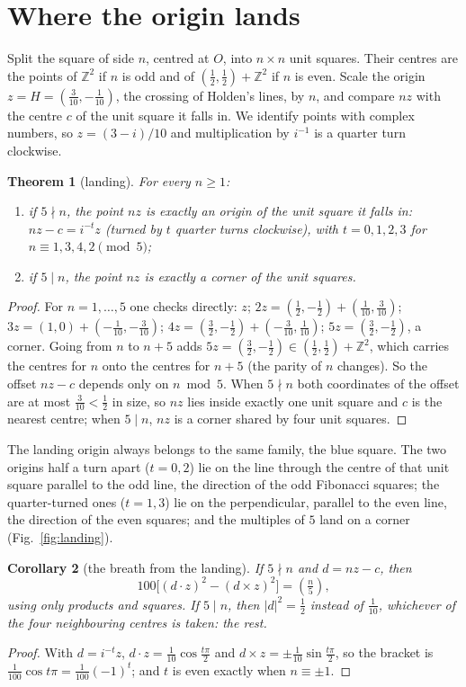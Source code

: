 \documentclass[11pt,a4paper]{article}
\theoremstyle{plain}
\newtheorem{theorem}{Theorem}
\newtheorem{corollary}[theorem]{Corollary}
\theoremstyle{definition}
\theoremstyle{remark}
\newcommand{\leg}[1]{\left(\tfrac{#1}{5}\right)}
\begin{document}
\section{Where the origin lands}
Split the square of side $n$, centred at $O$, into $n\times n$ unit squares. Their centres are the points of $\mathbb Z^2$ if $n$ is odd and of $(\tfrac12,\tfrac12)+\mathbb Z^2$ if $n$ is even. Scale the origin $z=H=(\tfrac3{10},-\tfrac1{10})$, the crossing of Holden's lines, by $n$, and compare $nz$ with the centre $c$ of the unit square it falls in. We identify points with complex numbers, so $z=(3-i)/10$ and multiplication by $i^{-1}$ is a quarter turn clockwise.
\begin{theorem}[landing]\label{thm:landing}
For every $n\ge1$:
\begin{enumerate}[label=(\alph*),nosep]
\item if $5\nmid n$, the point $nz$ is exactly an origin of the unit square it falls in: $nz-c=i^{-t}z$ (turned by $t$ quarter turns clockwise), with $t=0,1,2,3$ for $n\equiv1,3,4,2\pmod5$;
\item if $5\mid n$, the point $nz$ is exactly a corner of the unit squares.
\end{enumerate}
\end{theorem}
\begin{proof}
For $n=1,\dots,5$ one checks directly: $z$; $2z=(\tfrac12,-\tfrac12)+(\tfrac1{10},\tfrac3{10})$; $3z=(1,0)+(-\tfrac1{10},-\tfrac3{10})$; $4z=(\tfrac32,-\tfrac12)+(-\tfrac3{10},\tfrac1{10})$; $5z=(\tfrac32,-\tfrac12)$, a corner. Going from $n$ to $n+5$ adds $5z=(\tfrac32,-\tfrac12)\in(\tfrac12,\tfrac12)+\mathbb Z^2$, which carries the centres for $n$ onto the centres for $n+5$ (the parity of $n$ changes). So the offset $nz-c$ depends only on $n\bmod5$. When $5\nmid n$ both coordinates of the offset are at most $\tfrac3{10}<\tfrac12$ in size, so $nz$ lies inside exactly one unit square and $c$ is the nearest centre; when $5\mid n$, $nz$ is a corner shared by four unit squares.
\end{proof}
The landing origin always belongs to the same family, the blue square. The two origins half a turn apart ($t=0,2$) lie on the line through the centre of that unit square parallel to the odd line, the direction of the odd Fibonacci squares; the quarter-turned ones ($t=1,3$) lie on the perpendicular, parallel to the even line, the direction of the even squares; and the multiples of $5$ land on a corner (Fig.~\ref{fig:landing}).

\begin{corollary}[the breath from the landing]\label{cor:sign}
If $5\nmid n$ and $d=nz-c$, then
\[
100\bigl[(d\cdot z)^2-(d\times z)^2\bigr]=\leg{n},
\]
using only products and squares. If $5\mid n$, then $|d|^2=\tfrac12$ instead of $\tfrac1{10}$, whichever of the four neighbouring centres is taken: the rest.
\end{corollary}
\begin{proof}
With $d=i^{-t}z$, $d\cdot z=\tfrac1{10}\cos\tfrac{t\pi}2$ and $d\times z=\pm\tfrac1{10}\sin\tfrac{t\pi}2$, so the bracket is $\tfrac1{100}\cos t\pi=\tfrac1{100}(-1)^t$; and $t$ is even exactly when $n\equiv\pm1$.
\end{proof}
\end{document}
